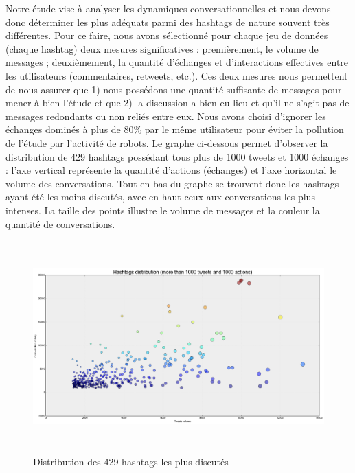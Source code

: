 Notre étude vise à analyser les dynamiques conversationnelles et nous devons donc déterminer les plus adéquats parmi des hashtags de nature souvent très différentes. Pour ce faire, nous avons sélectionné pour chaque jeu de données (chaque hashtag) deux mesures significatives : premièrement, le volume de messages ; deuxièmement, la quantité d{\textquoteright}échanges et d{\textquoteright}interactions effectives entre les utilisateurs (commentaires, retweets, etc.). Ces deux mesures nous permettent de nous assurer que 1) nous possédons une quantité suffisante de messages pour mener à bien l{\textquoteright}étude et que 2) la discussion a bien eu lieu et qu{\textquoteright}il ne s{\textquoteright}agit pas de messages redondants ou non reliés entre eux. Nous avons choisi d{\textquoteright}ignorer les échanges dominés à plus de 80\% par le m\^eme utilisateur pour éviter la pollution de l{\textquoteright}étude par l{\textquoteright}activité de robots. Le graphe ci-dessous permet d{\textquoteright}observer la distribution de 429 hashtags possédant tous plus de 1000 tweets et 1000 échanges : l{\textquoteright}axe vertical représente la quantité d{\textquoteright}actions (échanges) et l{\textquoteright}axe horizontal le volume des conversations. Tout en bas du graphe se trouvent donc les hashtags ayant été les moins discutés, avec en haut ceux aux conversations les plus intenses. La taille des points illustre le volume de messages et la couleur la quantité de conversations.

\begin{figure}
    \centering
    \includegraphics[width=6.0114in,height=3.2114in]{figures/chap3/chapitre3-img8.png}
    \caption{Distribution des 429 hashtags les plus discutés}
\end{figure}


